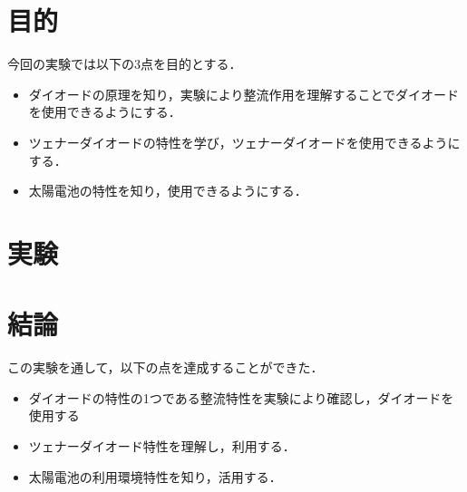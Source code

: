 \documentclass[11pt,dvipdfmx]{ujarticle}
\begin{document}
\begin{jikkenTitle}
\end{jikkenTitle}

\section{目的}
今回の実験では以下の3点を目的とする．
\begin{itemize}
	\item ダイオードの原理を知り，実験により整流作用を理解することでダイオードを使用できるようにする．
	\item ツェナーダイオードの特性を学び，ツェナーダイオードを使用できるようにする．
	\item 太陽電池の特性を知り，使用できるようにする．
\end{itemize}


\clearpage
\section{実験}





\clearpage
\section{結論}
この実験を通して，以下の点を達成することができた．
\begin{itemize}
	\item ダイオードの特性の1つである整流特性を実験により確認し，ダイオードを使用する
	\item ツェナーダイオード特性を理解し，利用する．
	\item 太陽電池の利用環境特性を知り，活用する．
\end{itemize}

\newpage
\printbibliography[title=参考文献]
\end{document}
